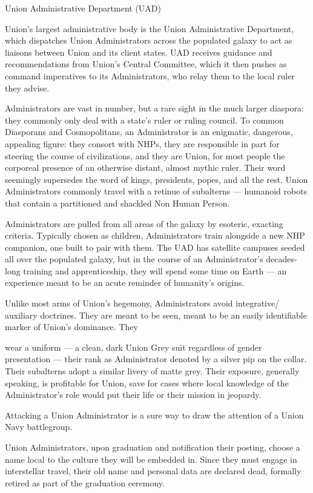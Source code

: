 Union Administrative Department (UAD)

Union’s largest administrative body is the Union Administrative Department, which dispatches
Union Administrators across the populated galaxy to act as liaisons between Union and its client
states. UAD receives guidance and recommendations from Union’s Central Committee, which it
then pushes as command imperatives to its Administrators, who relay them to the local ruler they
advise.


Administrators are vast in number, but a rare sight in the much larger diaspora: they commonly
only deal with a state’s ruler or ruling council. To common Diasporans and Cosmopolitans, an
Administrator is an enigmatic, dangerous, appealing figure: they consort with NHPs, they are
responsible in part for steering the course of civilizations, and they are Union, for most people
the corporeal presence of an otherwise distant, almost mythic ruler. Their word seemingly
supersedes the word of kings, presidents, popes, and all the rest. Union Administrators
commonly travel with a retinue of subalterns — humanoid robots that contain a partitioned and
shackled Non Human Person.


Administrators are pulled from all areas of the galaxy by esoteric, exacting criteria. Typically
chosen as children, Administrators train alongside a new NHP companion, one built to pair with
them. The UAD has satellite campuses seeded all over the populated galaxy, but in the course of
an Administrator’s decades-long training and apprenticeship, they will spend some time on Earth
— an experience meant to be an acute reminder of humanity’s origins.


Unlike most arms of Union’s hegemony, Administrators avoid integrative/ auxiliary doctrines.
They are meant to be seen, meant to be an easily identifiable marker of Union’s dominance. They




wear a uniform — a clean, dark Union Grey suit regardless of gender presentation — their rank
as Administrator denoted by a silver pip on the collar. Their subalterns adopt a similar livery of
matte grey. Their exposure, generally speaking, is profitable for Union, save for cases where local
knowledge of the Administrator’s role would put their life or their mission in jeopardy.


Attacking a Union Administrator is a sure way to draw the attention of a Union Navy battlegroup.


Union Administrators, upon graduation and notification their posting, choose a name local to the
culture they will be embedded in. Since they must engage in interstellar travel, their old name
and personal data are declared dead, formally retired as part of the graduation ceremony.


